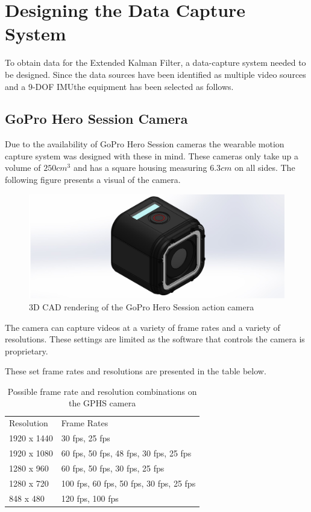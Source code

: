 \chapter{Designing the Data Capture System}
To obtain data for the Extended Kalman Filter, a data-capture system needed to be designed. Since the data sources have been identified as multiple video sources and a 9-DOF IMUthe equipment has been selected as follows. 

\section{GoPro Hero Session Camera}
Due to the availability of GoPro Hero Session cameras the wearable motion capture system was designed with these in mind. These cameras only take up a volume of $250cm^3$ and has a square housing measuring $6.3cm$ on all sides. The following figure presents a visual of the camera.

\begin{figure}[!ht] 
\captionsetup{width=\linewidth, font=small}  
\includegraphics[width=\linewidth]{figures/GoProHero4Session.JPG}
\caption{3D CAD rendering of the GoPro Hero Session action camera}
\label{fig:GoProHero4Session}
\end{figure}

The camera can capture videos at a variety of frame rates and a variety of resolutions. These settings are limited as the software that controls the camera is proprietary.

These set frame rates and resolutions are presented in the table below.
\begin{table}[]
\centering
\caption{Possible frame rate and resolution combinations on the GPHS camera}
\label{framesres}
\begin{tabular}{ll}
Resolution  & Frame Rates                             \\
1920 x 1440 & 30 fps, 25 fps                          \\
1920 x 1080 & 60 fps, 50 fps, 48 fps, 30 fps, 25 fps  \\
1280 x 960  & 60 fps, 50 fps, 30 fps, 25 fps          \\
1280 x 720  & 100 fps, 60 fps, 50 fps, 30 fps, 25 fps \\
848 x 480   & 120 fps, 100 fps                       
\end{tabular}
\end{table}

